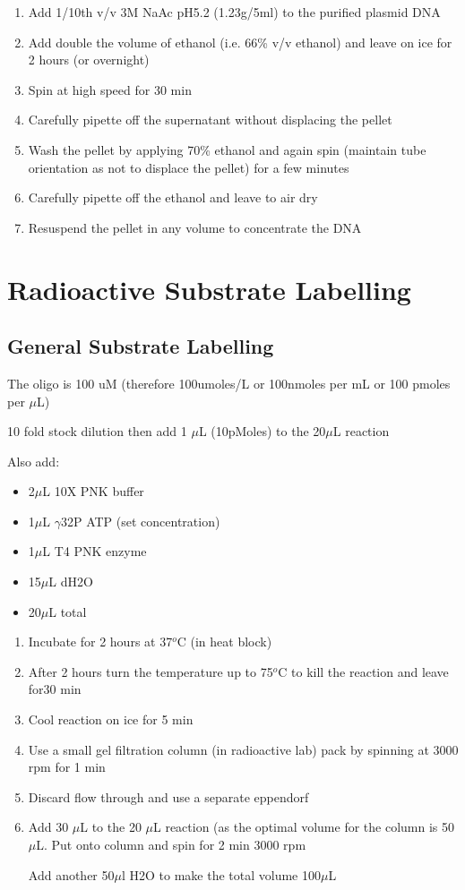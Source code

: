 \documentclass{tufte-book} %
\begin{document}
\begin{enumerate}
\item Add 1/10th v/v 3M NaAc pH5.2 (1.23g/5ml) to the purified plasmid DNA
\item Add double the volume of ethanol (i.e. 66\% v/v ethanol) and leave on ice for 2 hours (or overnight)
\item Spin at high speed for 30 min
\item Carefully pipette off the supernatant without displacing the pellet
\item Wash the pellet by applying 70\% ethanol and again spin (maintain tube orientation as not to displace the pellet) for a few minutes
\item Carefully pipette off the ethanol and leave to air dry
\item Resuspend the pellet in any volume to concentrate the DNA
\end{enumerate}

\section{Radioactive Substrate Labelling}


\subsection{General Substrate Labelling}

The oligo is 100 uM (therefore 100umoles/L or 100nmoles per mL or 100 pmoles per $\mu$L)


10 fold stock dilution then add 1 $\mu$L (10pMoles) to the 20$\mu$L reaction

Also add:
\begin{itemize}
\item 2$\mu$L 10X PNK buffer
\item 1$\mu$L $\gamma$32P ATP (set concentration)
\item 1$\mu$L T4 PNK enzyme
\item15$\mu$L dH2O
\item 20$\mu$L total
\end{itemize}

\begin{enumerate}
\item Incubate for 2 hours at 37$^{o}$C (in heat block)

\item After 2 hours turn the temperature up to 75$^{o}$C to kill the reaction and leave for30 min

\item Cool reaction on ice for 5 min

\item Use a small gel filtration column (in radioactive lab) pack by spinning at 3000 rpm for 1 min

\item Discard flow through and use a separate eppendorf

\item Add 30 $\mu$L to the 20 $\mu$L reaction (as the optimal volume for the column is 50 $\mu$L. Put onto column and spin for 2 min 3000 rpm

Add another 50$\mu$l H2O to make the total volume 100$\mu$L
\end{enumerate}
\end{document}
